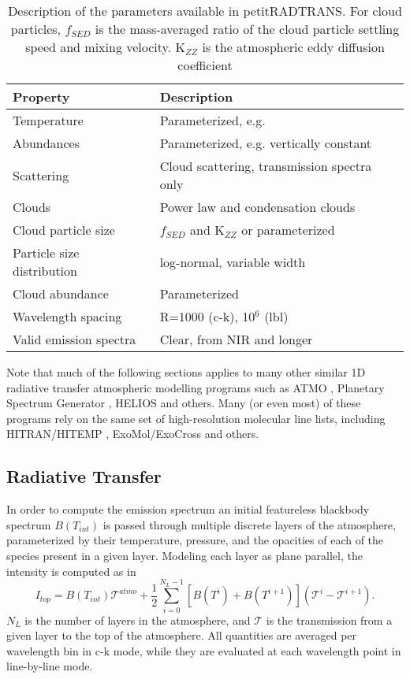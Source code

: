 \begin{table}[t]
	\centering
	\begin{tabular}{ll}
		\toprule
		\textbf{Property} & \textbf{Description}\\
		\midrule
		Temperature & Parameterized, e.g. \parencite{Guillot2010}\\
		Abundances & Parameterized, e.g. vertically constant\\
		Scattering & Cloud scattering, transmission spectra only\\
		Clouds & Power law and condensation clouds\\
		Cloud particle size & $f_{SED}$ and K$_{ZZ}$ or parameterized\\
		Particle size distribution & log-normal, variable width\\
		Cloud abundance & Parameterized\\
		Wavelength spacing & R=1000 (c-k), 10$^{6}$ (lbl)\\
		Valid emission spectra & Clear, from NIR and longer\\
		\bottomrule
	\end{tabular}
	\caption{Description of the parameters available in petitRADTRANS. For cloud particles, $f_{SED}$ is the mass-averaged ratio of the cloud particle settling speed and mixing velocity. K$_{ZZ}$ is the atmospheric eddy diffusion coefficient \parencite{Ackerman2001}}
	\label{tab:petitradparams}
\end{table}

Note that much of the following sections applies to many other similar 1D radiative transfer atmospheric modelling programs such as ATMO \parencite{Goyal2019}, Planetary Spectrum Generator \parencite{Villanueva2018}, HELIOS \parencite{Malik2017,Malik2019} and others.
Many (or even most) of these programs rely on the same set of high-resolution molecular line lists, including HITRAN/HITEMP \parencite{Rothman1981,Rothman2010,Gordon2017}, ExoMol/ExoCross \parencite{Tennyson2016,Tennyson2017,Yurchenko2018} and others. 

\subsection{Radiative Transfer}
In order to compute the emission spectrum an initial featureless blackbody spectrum $B(T_{int})$ is passed through multiple discrete layers of the atmosphere, parameterized by their temperature, pressure, and the opacities of each of the species present in a given layer.
Modeling each layer as plane parallel, the intensity is computed as in \parencite{Irwin2008,Molliere2017,Molliere2019}
\begin{equation}
I_{top} = B(T_{int})\mathcal{T}^{atmo} + \frac{1}{2}\sum_{i=0}^{N_{L}-1}\left[B(T^{i}) + B(T^{i+1})\right]\left(\mathcal{T}^{i}-\mathcal{T}^{i+1}\right).
\end{equation}
$N_{L}$ is the number of layers in the atmosphere, and $\mathcal{T}$ is the transmission from a given layer to the top of the atmosphere. All quantities are averaged per wavelength bin in c-k mode, while they are evaluated at each wavelength point in line-by-line mode.

